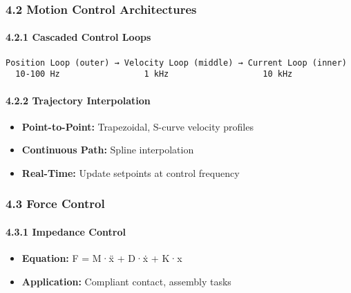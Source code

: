 \documentclass[
]{article}
\providecommand{\tightlist}{%
  \setlength{\itemsep}{0pt}\setlength{\parskip}{0pt}}
\begin{document}
\hypertarget{motion-control-architectures}{%
\subsubsection{4.2 Motion Control
Architectures}\label{motion-control-architectures}}

\hypertarget{cascaded-control-loops}{%
\paragraph{4.2.1 Cascaded Control Loops}\label{cascaded-control-loops}}

\begin{verbatim}
Position Loop (outer) → Velocity Loop (middle) → Current Loop (inner)
  10-100 Hz                 1 kHz                   10 kHz
\end{verbatim}

\hypertarget{trajectory-interpolation}{%
\paragraph{4.2.2 Trajectory
Interpolation}\label{trajectory-interpolation}}

\begin{itemize}
\tightlist
\item
  \textbf{Point-to-Point:} Trapezoidal, S-curve velocity profiles
\item
  \textbf{Continuous Path:} Spline interpolation
\item
  \textbf{Real-Time:} Update setpoints at control frequency
\end{itemize}

\hypertarget{force-control}{%
\subsubsection{4.3 Force Control}\label{force-control}}

\hypertarget{impedance-control}{%
\paragraph{4.3.1 Impedance Control}\label{impedance-control}}

\begin{itemize}
\tightlist
\item
  \textbf{Equation:} F = M·ẍ + D·ẋ + K·x
\item
  \textbf{Application:} Compliant contact, assembly tasks
\end{itemize}
\end{document}
